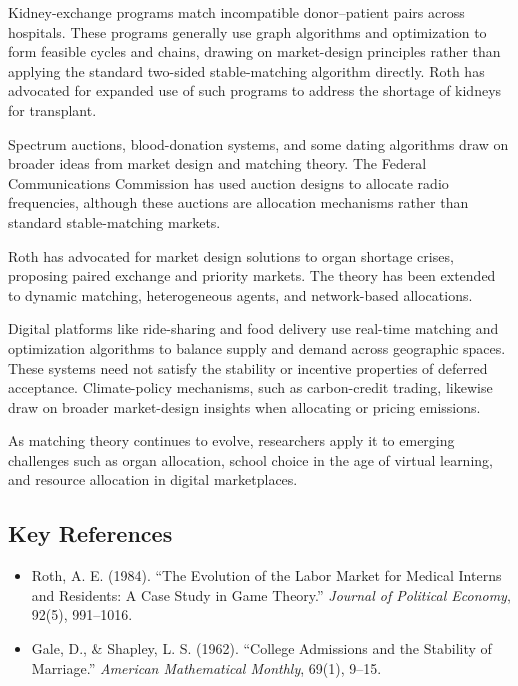 Kidney-exchange programs match incompatible donor--patient pairs across hospitals.
These programs generally use graph algorithms and optimization to form feasible
cycles and chains, drawing on market-design principles rather than applying the
standard two-sided stable-matching algorithm directly. Roth has advocated for
expanded use of such programs to address the shortage of kidneys for transplant.

Spectrum auctions, blood-donation systems, and some dating algorithms draw on
broader ideas from market design and matching theory. The Federal Communications
Commission has used auction designs to allocate radio frequencies, although these
auctions are allocation mechanisms rather than standard stable-matching markets.

Roth has advocated for market design solutions to organ shortage crises,
proposing paired exchange and priority markets. The theory has been extended to
dynamic matching, heterogeneous agents, and network-based allocations.

Digital platforms like ride-sharing and food delivery use real-time matching and
optimization algorithms to balance supply and demand across geographic spaces.
These systems need not satisfy the stability or incentive properties of deferred
acceptance. Climate-policy mechanisms, such as carbon-credit trading, likewise
draw on broader market-design insights when allocating or pricing emissions.

As matching theory continues to evolve, researchers apply it to emerging
challenges such as organ allocation, school choice in the age of virtual
learning, and resource allocation in digital marketplaces.

\subsection*{Key References}
\begin{itemize}
    \item Roth, A. E. (1984). ``The Evolution of the Labor Market for Medical Interns and Residents: A Case Study in Game Theory.'' \textit{Journal of Political Economy}, 92(5), 991--1016.
    \item Gale, D., \& Shapley, L. S. (1962). ``College Admissions and the Stability of Marriage.'' \textit{American Mathematical Monthly}, 69(1), 9--15.
\end{itemize}
